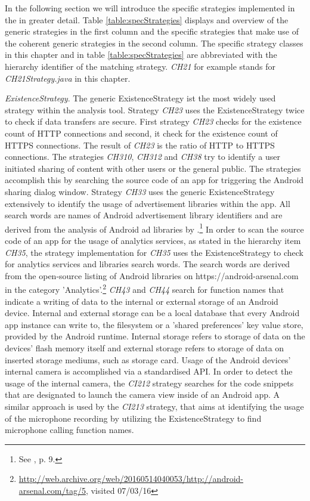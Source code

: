 In the following section we will introduce the specific strategies implemented in the \aiprat in greater detail.
Table \ref{table:specStrategies} displays and overview of the generic strategies in the first column and the specific strategies that make use of the coherent generic strategies in the second column.
The specific strategy classes in this chapter and in table \ref{table:specStrategies} are abbreviated with the \ipp hierarchy identifier of the matching strategy. 
\textit{CH21} for example stands for \textit{CH21\textunderscore Strategy.java} in this chapter.

\textit{ExistenceStrategy}.
The generic ExistenceStrategy ist the most widely used strategy within the analysis tool.
Strategy \textit{CH23} uses the ExistenceStrategy twice to check if data transfers are secure. 
First strategy \textit{CH23} checks for the existence count of HTTP connections and second, it check for the existence count of HTTPS connections.
The result of \textit{CH23} is the ratio of \acs{HTTP} to \acs{HTTPS} connections.
The strategies \textit{CH310}, \textit{CH312} and \textit{CH38} try to identify a user initiated sharing of content with other users or the general public.
The strategies accomplish this by searching the source code of an app for triggering the Android sharing dialog window.
Strategy \textit{CH33} uses the generic ExistenceStrategy extensively to identify the usage of advertisement libraries within the app.
All search words are names of Android advertisement library identifiers and are derived from the analysis of Android ad libraries by \cite{Book2013}.\footnote{See \cite{Book2013}, p. 9.}
In order to scan the source code of an app for the usage of analytics services, as stated in the hierarchy item \textit{CH35}, the strategy implementation for \textit{CH35} uses the ExistenceStrategy to check for analytics services and libraries search words.
The search words are derived from the open-source listing of Android libraries on https://android-arsenal.com in the category 'Analytics'.\footnote{\url{http://web.archive.org/web/20160514040053/http://android-arsenal.com/tag/5}, visited 07/03/16}
\textit{CH43} and \textit{CH44} search for function names that indicate a writing of data to the internal or external storage of an Android device.
Internal and external storage can be a local database that every Android app instance can write to, the filesystem or a 'shared preferences' key value store, provided by the Android runtime.
Internal storage refers to storage of data on the devices' flash memory itself and external storage refers to storage of data on inserted storage mediums, such as storage card.
Usage of the Android devices' internal camera is accomplished via a standardised \acs{API}.
In order to detect the usage of the internal camera, the \textit{CI212} strategy searches for the code snippets that are designated to launch the camera view inside of an Android app.
A similar approach is used by the \textit{CI213} strategy, that aims at identifying the usage of the microphone recording by utilizing the ExistenceStrategy to find microphone calling function names.

